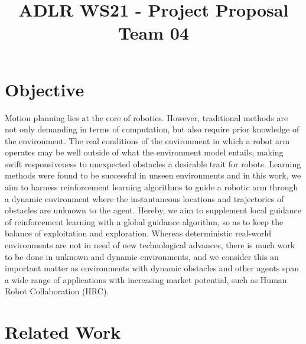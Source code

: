 \documentclass[conference]{IEEEtran}
\begin{document}
\title{ADLR WS21 - Project Proposal Team 04\\
}

\author{
\and
{}
}

\maketitle

\section{Objective}
Motion planning lies at the core of robotics. However, traditional methods are not only demanding in terms of computation, but also require prior knowledge of the environment. The real conditions of the environment in which a robot arm operates may be well outside of what the environment model entails, making swift responsiveness to unexpected obstacles a desirable trait for robots. Learning methods were found to be successful in unseen environments and in this work, we aim to harness reinforcement learning algorithms to guide a robotic arm through a dynamic environment where the instantaneous locations and trajectories of obstacles are unknown to the agent. Hereby, we aim to supplement local guidance of reinforcement learning with a global guidance algorithm, so as to keep the balance of exploitation and exploration. Whereas deterministic real-world environments are not in need of new technological advances, there is much work to be done in unknown and dynamic environments, and we consider this an important matter as environments with dynamic obstacles and other agents span a wide range of applications with increasing market potential, such as Human Robot Collaboration (HRC).

\section{Related Work}
\end{document}
